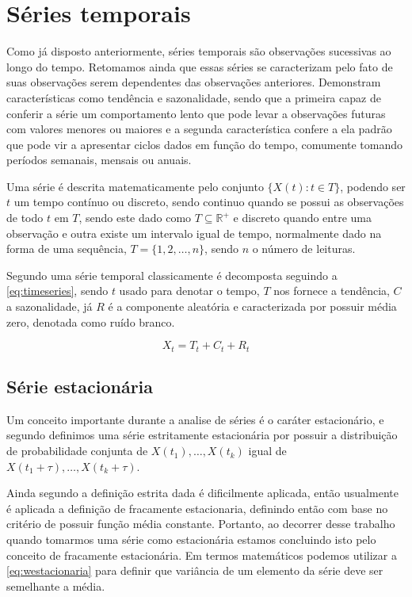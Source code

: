 \documentclass[
    12pt,
    oneside,
    a4paper,
    english,
    brazil
]{abntex2}
\begin{document}
\section{Séries temporais}

Como já disposto anteriormente, séries temporais são observações sucessivas ao
longo do tempo. Retomamos ainda que essas séries se caracterizam pelo fato de
suas observações serem dependentes das observações anteriores. Demonstram
características como tendência e sazonalidade, sendo que a primeira capaz de
conferir a série um comportamento lento que pode levar a observações futuras com
valores menores ou maiores e a segunda característica confere a ela padrão que
pode vir a apresentar ciclos dados em função do tempo, comumente tomando
períodos semanais, mensais ou anuais.

Uma série é descrita matematicamente pelo conjunto $\{X(t): t \in T\}$, podendo
ser $t$ um tempo contínuo ou discreto, sendo continuo quando se possui as
observações de todo $t$ em $T$, sendo este dado como $T \subseteq
\mathbb{R}^{+}$ e discreto quando entre uma observação e outra existe um
intervalo igual de tempo, normalmente dado na forma de uma sequência, $T = \{1,
2, \ldots, n\}$, sendo $n$ o número de leituras.

Segundo  uma série temporal classicamente é decomposta
seguindo a \autoref{eq:timeseries}, sendo $t$ usado para denotar o tempo, $T$
nos fornece a tendência, $C$ a sazonalidade, já $R$ é a componente aleatória e
caracterizada por possuir média zero, denotada como ruído branco.

\begin{equation}
    \label{eq:timeseries}
    X_t = T_t + C_t + R_t
\end{equation}

\subsection{Série estacionária}

Um conceito importante durante a analise de séries é o caráter estacionário, e
segundo  definimos uma série estritamente estacionária por
possuir a distribuição de probabilidade conjunta de $X(t_1), \ldots, X(t_k)$
igual de $X(t_1 + \tau), \ldots, X(t_k + \tau)$.

Ainda segundo  a definição estrita dada é dificilmente
aplicada, então usualmente é aplicada a definição de fracamente estacionaria,
definindo então com base no critério de possuir função média constante.
Portanto, ao decorrer desse trabalho quando tomarmos uma série como estacionária
estamos concluindo isto pelo conceito de fracamente estacionária. Em termos
matemáticos podemos utilizar a \autoref{eq:westacionaria} para definir que
variância de um elemento da série deve ser semelhante a média.
\end{document}
